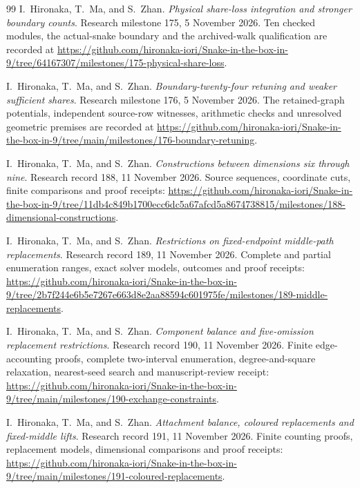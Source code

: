 \documentclass[11pt,a4paper]{article}
\theoremstyle{definition}
\theoremstyle{remark}
\begin{document}
\begin{thebibliography}{99}
I.~Hironaka, T.~Ma, and S.~Zhan. \emph{Physical share-loss integration and stronger boundary counts}. Research milestone 175, 5 November 2026. Ten checked modules, the actual-snake boundary and the archived-walk qualification are recorded at
\url{https://github.com/hironaka-iori/Snake-in-the-box-in-9/tree/64167307/milestones/175-physical-share-loss}.

I.~Hironaka, T.~Ma, and S.~Zhan. \emph{Boundary-twenty-four retuning and weaker sufficient shares}. Research milestone 176, 5 November 2026. The retained-graph potentials, independent source-row witnesses, arithmetic checks and unresolved geometric premises are recorded at
\url{https://github.com/hironaka-iori/Snake-in-the-box-in-9/tree/main/milestones/176-boundary-retuning}.


I.~Hironaka, T.~Ma, and S.~Zhan. \emph{Constructions between dimensions six through nine}. Research record 188, 11 November 2026. Source sequences, coordinate cuts, finite comparisons and proof receipts:
\url{https://github.com/hironaka-iori/Snake-in-the-box-in-9/tree/11db4c849b1700ecc6dc5a67afcd5a8674738815/milestones/188-dimensional-constructions}.

I.~Hironaka, T.~Ma, and S.~Zhan. \emph{Restrictions on fixed-endpoint middle-path replacements}. Research record 189, 11 November 2026. Complete and partial enumeration ranges, exact solver models, outcomes and proof receipts:
\url{https://github.com/hironaka-iori/Snake-in-the-box-in-9/tree/2b7f244e6b5e7267e663d8e2aa88594c601975fe/milestones/189-middle-replacements}.


I.~Hironaka, T.~Ma, and S.~Zhan. \emph{Component balance and five-omission replacement restrictions}. Research record 190, 11 November 2026. Finite edge-accounting proofs, complete two-interval enumeration, degree-and-square relaxation, nearest-seed search and manuscript-review receipt:
\url{https://github.com/hironaka-iori/Snake-in-the-box-in-9/tree/main/milestones/190-exchange-constraints}.

I.~Hironaka, T.~Ma, and S.~Zhan. \emph{Attachment balance, coloured replacements and fixed-middle lifts}. Research record 191, 11 November 2026. Finite counting proofs, replacement models, dimensional comparisons and proof receipts:
\url{https://github.com/hironaka-iori/Snake-in-the-box-in-9/tree/main/milestones/191-coloured-replacements}.


\end{thebibliography}
\end{document}
